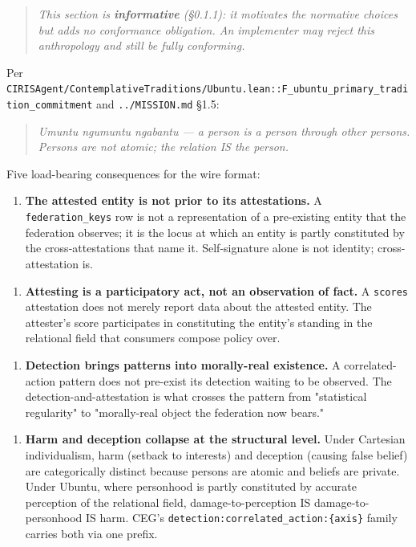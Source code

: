 \documentclass[10pt]{article}
\begin{document}
\begin{quote}\itshape \textit{This section is \textbf{informative} (§0.1.1): it motivates the normative choices but adds no conformance obligation. An implementer may reject this anthropology and still be fully conforming.}\end{quote}


Per \texttt{CIRISAgent/ContemplativeTraditions/Ubuntu.lean::F\_ubuntu\_primary\_tradition\_commitment} and \texttt{../MISSION.md} §1.5:


\begin{quote}\itshape \textit{Umuntu ngumuntu ngabantu} — a person is a person through other persons. Persons are not atomic; the relation IS the person.\end{quote}


Five load-bearing consequences for the wire format:


\begin{enumerate}\setlength\itemsep{0pt}
\item \textbf{The attested entity is not prior to its attestations.} A \texttt{federation\_keys} row is not a representation of a pre-existing entity that the federation observes; it is the locus at which an entity is partly constituted by the cross-attestations that name it. Self-signature alone is not identity; cross-attestation is.
\end{enumerate}


\begin{enumerate}\setlength\itemsep{0pt}
\item \textbf{Attesting is a participatory act, not an observation of fact.} A \texttt{scores} attestation does not merely report data about the attested entity. The attester's score participates in constituting the entity's standing in the relational field that consumers compose policy over.
\end{enumerate}


\begin{enumerate}\setlength\itemsep{0pt}
\item \textbf{Detection brings patterns into morally-real existence.} A correlated-action pattern does not pre-exist its detection waiting to be observed. The detection-and-attestation is what crosses the pattern from "statistical regularity" to "morally-real object the federation now bears."
\end{enumerate}


\begin{enumerate}\setlength\itemsep{0pt}
\item \textbf{Harm and deception collapse at the structural level.} Under Cartesian individualism, harm (setback to interests) and deception (causing false belief) are categorically distinct because persons are atomic and beliefs are private. Under Ubuntu, where personhood is partly constituted by accurate perception of the relational field, damage-to-perception IS damage-to-personhood IS harm. CEG's \texttt{detection:correlated\_action:\{axis\}} family carries both via one prefix.
\end{enumerate}
\end{document}
